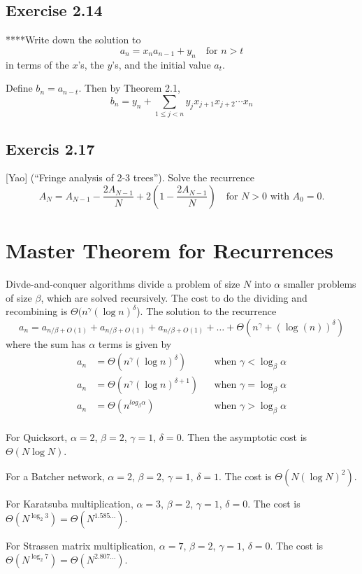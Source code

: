 \documentclass[11pt, oneside]{article}   	%
\begin{document}
\subsection*{Exercise 2.14}


****Write down the solution to
\[
	a_n = x_n a_{n-1} + y_n \quad \text{for $n>t$}
\]
in terms of the $x$'s, the $y$'s, and the initial value $a_t$.

Define $b_n = a_{n-t}$.  Then by Theorem 2.1,
\[
	b_n = y_n + \sum_{1 \le j < n} y_j x_{j+1} x_{j+2} \cdots x_n
\]


\subsection*{Exercis 2.17}
[Yao] (``Fringe analysis of 2-3 trees''). Solve the recurrence
\[
	A_N = A_{N-1} - \frac{2A_{N-1}}{N} + 2 \left( 1 - \frac{2A_{N-1}}{N} \right) \quad \text{for $N>0$ with $A_0=0$.}
\]

\section{Master Theorem for Recurrences}
Divde-and-conquer algorithms divide a problem of size $N$ into $\alpha$ smaller problems of size $\beta$, which are solved recursively.
The cost to do the dividing and recombining is $\Theta(n^\gamma (\log n)^\delta$).
The solution to the recurrence
\[
	a_n = a_{n/\beta +O(1)} + a_{n/\beta+O(1)} + a_{n/\beta +O(1)} + \dots + \Theta(n^\gamma+(\log(n))^\delta)
\]
where the sum has $\alpha$ terms is given by
\begin{align}
	a_n &= \Theta(n^\gamma (\log n)^\delta)         &&\text{when } \gamma < \log_\beta \alpha \\
	a_n &=\Theta(n^\gamma (\log n)^{\delta+1})   &&\text{when } \gamma = \log_\beta \alpha \\
	a_n &=\Theta(n^{log_\beta \alpha})                   &&\text{when } \gamma > \log_\beta \alpha \\
\end{align}

For Quicksort, $\alpha=2$, $\beta=2$, $\gamma=1$, $\delta=0$. Then the asymptotic cost is $\Theta(N \log N)$.

For a Batcher network, $\alpha=2$, $\beta=2$, $\gamma=1$, $\delta=1$. The cost is $\Theta(N(\log N)^2)$.

For Karatsuba multiplication, $\alpha=3$, $\beta=2$, $\gamma=1$, $\delta=0$. The cost is $\Theta(N^{\log_2 3}) = \Theta(N^{1.585...})$.

For Strassen matrix multiplication, $\alpha=7$, $\beta=2$, $\gamma=1$, $\delta=0$. The cost is $\Theta(N^{\log_2 7}) = \Theta(N^{2.807...})$.
\end{document}
